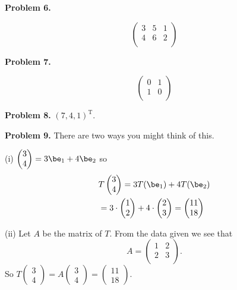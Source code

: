 \documentclass[oneside,12pt]{amsart}
\begin{document}
\bigskip

\textbf{Problem 6.}

$$
\begin{pmatrix}
3 & 5 & 1 \\
4 & 6 & 2 \\
\end{pmatrix}
$$

\bigskip

\textbf{Problem 7.}

$$
\begin{pmatrix}
0 & 1 \\
1 & 0 \\
\end{pmatrix}
$$

\bigskip

\textbf{Problem 8.} $(7, 4, 1)^{\text{T}}$.

\bigskip


\textbf{Problem 9.} There are two ways you might think of this.

\smallskip

(i) $\begin{pmatrix} 3 \\ 4\end{pmatrix} = 3 \be_1 + 4 \be_2$
so
\begin{align*}
&T\begin{pmatrix} 3 \\ 4\end{pmatrix} = 3 T(\be_1) + 4 T(\be_2) \\
&= 3\cdot \begin{pmatrix} 1 \\ 2\end{pmatrix} + 4 \cdot \begin{pmatrix} 2 \\ 3\end{pmatrix}
=\begin{pmatrix} 11 \\ 18\end{pmatrix}
\end{align*}

\medskip

(ii) Let $A$ be the matrix of $T$. From the data given we see that
$$A = \begin{pmatrix}
1 & 2 \\
2 & 3 \\
\end{pmatrix}
.$$
So $T\begin{pmatrix} 3 \\ 4\end{pmatrix} = A\begin{pmatrix} 3 \\ 4\end{pmatrix} = \begin{pmatrix} 11 \\ 18\end{pmatrix}$.
\end{document}
